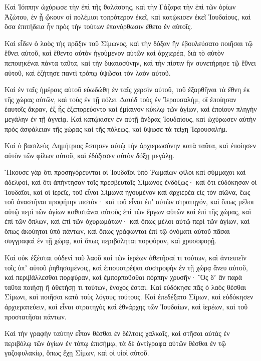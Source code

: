 {Καὶ Ἰόππην ὠχύρωσε τὴν ἐπὶ τῆς θαλάσσης, καὶ τὴν Γάζαρα τὴν ἐπὶ τῶν ὁρίων Ἀζώτου, ἐν ᾗ ᾤκουν οἱ πολέμιοι τοπρότερον ἐκεῖ, καὶ κατῴκισεν ἐκεῖ Ἰουδαίους, καὶ ὅσα ἐπιτήδεια ἦν πρὸς τὴν τούτων ἐπανόρθωσιν ἔθετο ἐν αὐτοῖς.
\par }{\PP {}Καὶ εἶδεν ὁ λαὸς τὴς πρᾶξιν τοῦ Σίμωνος, καὶ τὴν δόξαν ἣν ἐβουλεύσατο ποιῆσαι τῷ ἔθνει αὐτοῦ, καὶ ἔθεντο αὐτὸν ἡγοὺμενον αὐτῶν καὶ ἀρχιερέα, διὰ τὸ αὐτὸν πεποιηκέναι πάντα ταῦτα, καὶ τὴν δικαιοσύνην, καὶ τὴν πίστιν ἣν συνετήρησε τῷ ἔθνει αὐτοῦ, καὶ ἐζήτησε παντὶ τρόπῳ ὑψῶσαι τὸν λαὸν αὐτοῦ.
\par }{\PP {}Καὶ ἐν ταῖς ἡμέραις αὐτοῦ εὐωδώθη ἐν ταῖς χερσὶν αὐτοῦ, τοῦ ἐξαρθῆναι τὰ ἔθνη ἐκ τῆς χώρας αὐτῶν, καὶ τοὺς ἐν τῇ πόλει Δαυὶδ τοὺς ἐν Ἱερουσαλὴμ, οἳ ἐποίησαν ἑαυτοῖς ἄκραν, ἐξ ἧς ἐξεπορεύοντο καὶ ἐμίαινον κύκλῳ τῶν ἁγίων, καὶ ἐποίουν πληγὴν μεγάλην ἐν τῇ ἁγνείᾳ.
Καὶ κατῴκισεν ἐν αὐτῇ ἄνδρας Ἰουδαίους, καὶ ὠχύρωσεν αὐτὴν πρὸς ἀσφάλειαν τῆς χώρας καὶ τῆς πόλεως, καὶ ὕψωσε τὰ τείχη Ἱερουσαλήμ.
\par }{\PP {}Καὶ ὁ βασιλεὺς Δημήτριος ἔστησεν αὐτῷ τὴν ἀρχιερωσύνην κατὰ ταῦτα,
καὶ ἐποίησεν αὐτὸν τῶν φίλων αὐτοῦ, καὶ ἐδόξασεν αὐτὸν δόξῃ μεγάλῃ.
\par }{\PP {}Ἤκουσε γὰρ ὅτι προσηγόρευνται οἱ Ἰουδαῖοι ὑπὸ Ῥωμαίων φίλοι καὶ σύμμαχοι καὶ ἀδελφοὶ, καὶ ὅτι ἀπήντησαν τοῖς πρεσβευταῖς Σίμωνος ἐνδόξως·
καὶ ὅτι εὐδόκησαν οἱ Ἰουδαῖοι, καὶ οἱ ἱερεῖς, τοῦ εἶναι Σίμωνα ἡγουμένον καὶ ἀρχιερέα εἰς τὸν αἰῶνα, ἕως τοῦ ἀναστῆναι προφήτην πιστόν·
καὶ τοῦ εἶναι ἐπʼ αὐτῶν στρατηγόν, καὶ ὅπως μέλοι αὐτῷ περὶ τῶν ἁγίων καθιστάναι αὐτοὺς ἐπὶ τῶν ἔργων αὐτῶν καὶ ἐπὶ τῆς χώρας, καὶ ἐπὶ τῶν ὅπλων, καὶ ἐπὶ τῶν ὀχυρωμάτων·
καὶ ὅπως μέλοι αὐτῷ περὶ τῶν ἁγίων, καὶ ὅπως ἀκούηται ὑπὸ πάντων, καὶ ὅπως γράφωνται ἐπὶ τῷ ὀνόματι αὐτοῦ πᾶσαι συγγραφαὶ ἐν τῇ χώρᾳ, καὶ ὅπως περιβάληται πορφύραν, καὶ χρυσοφορῇ.
\par }{\PP {}Καὶ οὐκ ἐξέσται οὐδενὶ τοῦ λαοῦ καἰ τῶν ἱερέων ἀθετῆσαί τι τούτων, καὶ ἀντειπεῖν τοῖς ὑπʼ αὐτοῦ ῥηθησομένοις, καὶ ἐπισυστρέψαι συστροφὴν ἐν τῇ χώρᾳ ἄνευ αὐτοῦ, καὶ περιβάλλεσθαι πορφύραν, καὶ ἐμπορποῦσθαι πόρπην χρυσῆν·
Ὃς δʼ ἂν παρὰ ταῦτα ποιήσῃ ἢ ἀθετήσῃ τι τούτων, ἔνοχος ἔσται.
Καὶ εὐδόκησε πᾶς ὁ λαὸς θέσθαι Σίμωνι, καὶ ποιῆσαι κατὰ τοὺς λόγους τούτους.
Καὶ ἐπεδέξατο Σίμων, καὶ εὐδόκησεν ἀρχιερατεύειν, καὶ εἶναι στρατηγὸς καὶ ἐθνάρχης τῶν Ἰουδαίων, καὶ ἱερέων, καὶ τοῦ προστατῆσαι πάντων.
\par }{\PP {}Καὶ τὴν γραφὴν ταύτην εἶπον θέσθαι ἐν δέλτοις χαλκαῖς, καὶ στῆσαι αὐτὰς ἐν περιβόλῳ τῶν ἁγίων ἐν τόπῳ ἐπισήμῳ,
τὰ δὲ ἀντίγραφα αὐτῶν θέσθαι ἐν τῷ γαζοφυλακίῳ, ὅπως ἕχῃ Σίμων, καὶ οἱ υἱοὶ αὐτοῦ.

}
